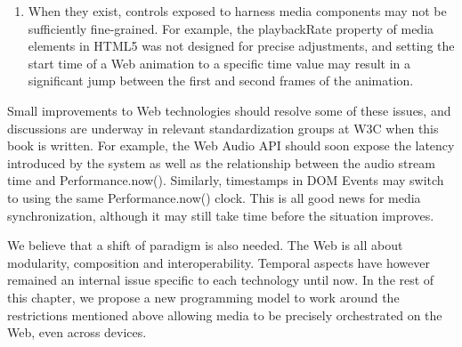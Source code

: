 \begin{enumerate}
\item{
When they exist, controls exposed to harness media components may not be
sufficiently fine-grained. For example, the playbackRate property of media
elements in HTML5 was not designed for precise adjustments, and setting the
start time of a Web animation to a specific time value may result in a
significant jump between the first and second frames of the animation.
}

\end{enumerate}

Small improvements to Web technologies should resolve some of these issues,
and discussions are underway in relevant standardization groups at W3C when
this book is written. For example, the Web Audio API should soon expose the
latency introduced by the system as well as the relationship between the audio
stream time and Performance.now(). Similarly, timestamps in DOM Events may
switch to using the same Performance.now() clock. This is all good news for
media synchronization, although it may still take time before the situation
improves.

We believe that a shift of paradigm is also needed. The Web is all about
modularity, composition and interoperability. Temporal aspects have however
remained an internal issue specific to each technology until now. In the rest
of this chapter, we propose a new programming model to work around the
restrictions mentioned above allowing media to be precisely orchestrated on
the Web, even across devices.




